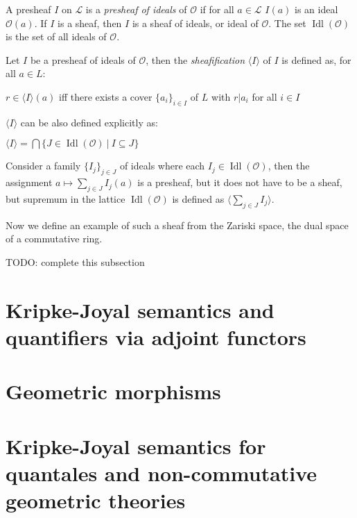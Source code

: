 \documentclass[a4paper]{article}
\theoremstyle{defin}
\theoremstyle{theorem}
\theoremstyle{claim}
\theoremstyle{prop}
\theoremstyle{lemma}
\theoremstyle{fact}
\theoremstyle{ex}
\theoremstyle{col}
\begin{document}
A presheaf $I$ on $\mathcal{L}$ is a \emph{presheaf of ideals} of $\mathcal{O}$ if for all $a \in \mathcal{L}$
$I(a)$ is an ideal $\mathcal{O}(a)$. If $I$ is a sheaf, then $I$ is a sheaf of ideals, or ideal of $\mathcal{O}$. The set $\operatorname{Idl}(\mathcal{O})$ is the set of all ideals of $\mathcal{O}$.

Let $I$ be a presheaf of ideals of $\mathcal{O}$, then the \emph{sheafification} $\langle I \rangle$ of $I$ is defined as, for all $a \in L$:
\begin{center}
$r \in \langle I \rangle(a)$ iff there exists a cover $\{ a_i \}_{i \in I}$ of $L$ with $r|a_i$ for all $i \in I$
\end{center}

$\langle I \rangle$ can be also defined explicitly as:
\begin{center}
$\langle I \rangle = \bigcap \{ J \in \operatorname{Idl}(\mathcal{O}) \: | \: I \subseteq J \}$
\end{center}

Consider a family $\{ I_j \}_{j \in J}$ of ideals where each $I_j \in \operatorname{Idl}(\mathcal{O})$, then the assignment $a \mapsto \sum \limits_{j \in J} I_j(a)$ is a presheaf, but it does not have to be a sheaf, but supremum in the lattice $\operatorname{Idl}(\mathcal{O})$ is defined as $\langle \sum \limits_{j \in J} I_j \rangle$.

Now we define an example of such a sheaf from the Zariski space, the dual space of a commutative ring.

TODO: complete this subsection

\section{Kripke-Joyal semantics and quantifiers via adjoint functors}

\section{Geometric morphisms}

\section{Kripke-Joyal semantics for quantales and non-commutative geometric theories}



\end{document}
